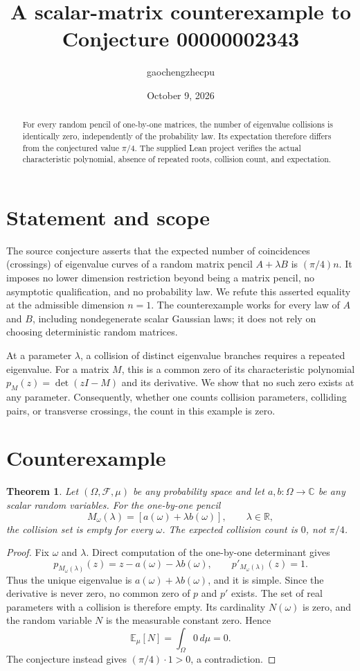 \documentclass[11pt]{article}
\title{A scalar-matrix counterexample to Conjecture 00000002343}
\author{gaochengzhecpu}
\date{October 9, 2026}
\newtheorem{theorem}{Theorem}
\begin{document}
\maketitle
\begin{abstract}
For every random pencil of one-by-one matrices, the number of eigenvalue
collisions is identically zero, independently of the probability law.
Its expectation therefore differs from the conjectured value $\pi/4$.
The supplied Lean project verifies the actual characteristic polynomial,
absence of repeated roots, collision count, and expectation.
\end{abstract}

\section{Statement and scope}
The source conjecture asserts that the expected number of coincidences
(crossings) of eigenvalue curves of a random matrix pencil $A+\lambda B$
is $(\pi/4)n$. It imposes no lower dimension restriction beyond being a
matrix pencil, no asymptotic qualification, and no probability law.
We refute this asserted equality at the admissible dimension $n=1$.
The counterexample works for every law of $A$ and $B$, including
nondegenerate scalar Gaussian laws; it does not rely on choosing
deterministic random matrices.

At a parameter $\lambda$, a collision of distinct eigenvalue branches
requires a repeated eigenvalue. For a matrix $M$, this is a common zero
of its characteristic polynomial $p_M(z)=\det(zI-M)$ and its derivative.
We show that no such zero exists at any parameter. Consequently, whether
one counts collision parameters, colliding pairs, or transverse crossings,
the count in this example is zero.

\section{Counterexample}
\begin{theorem}
Let $(\Omega,\mathcal F,\mu)$ be any probability space and let
$a,b:\Omega\to\mathbb C$ be any scalar random variables.
For the one-by-one pencil
\[
 M_\omega(\lambda)=[a(\omega)+\lambda b(\omega)],\qquad \lambda\in\mathbb R,
\]
the collision set is empty for every $\omega$. The expected collision
count is $0$, not $\pi/4$.
\end{theorem}
\begin{proof}
Fix $\omega$ and $\lambda$. Direct computation of the one-by-one determinant
gives
\[
 p_{M_\omega(\lambda)}(z)=z-a(\omega)-\lambda b(\omega),
 \qquad p'_{M_\omega(\lambda)}(z)=1.
\]
Thus the unique eigenvalue is $a(\omega)+\lambda b(\omega)$, and it is simple.
Since the derivative is never zero, no common zero of $p$ and $p'$ exists.
The set of real parameters with a collision is therefore empty.
Its cardinality $N(\omega)$ is zero, and the random variable $N$ is the
measurable constant zero. Hence
\[
 \mathbb E_\mu[N]=\int_\Omega 0\,d\mu=0.
\]
The conjecture instead gives $(\pi/4)\cdot 1>0$, a contradiction.
\end{proof}
\end{document}
